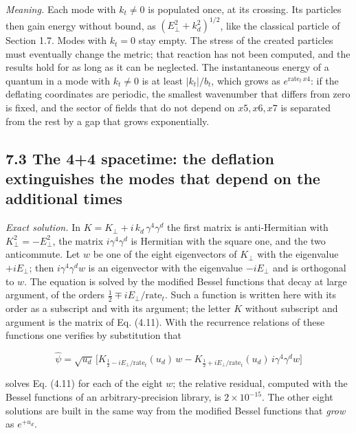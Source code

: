 \documentclass[
  10pt,
]{article}
\begin{document}
\emph{Meaning.} Each mode with \(k_t\neq0\) is populated once, at its
crossing. Its particles then gain energy without bound, as
\((E_\perp^2+k_d^2)^{1/2}\), like the classical particle of Section 1.7.
Modes with \(k_t=0\) stay empty. The stress of the created particles
must eventually change the metric; that reaction has not been computed,
and the results hold for as long as it can be neglected. The
instantaneous energy of a quantum in a mode with \(k_t\neq0\) is at
least \(|k_t|/b_t\), which grows as \(e^{\mathrm{rate}_t\,x4}\): if the
deflating coordinates are periodic, the smallest wavenumber that differs
from zero is fixed, and the sector of fields that do not depend on
\(x5,x6,x7\) is separated from the rest by a gap that grows
exponentially.

\hypertarget{the-44-spacetime-the-deflation-extinguishes-the-modes-that-depend-on-the-additional-times}{%
\subsection{7.3 The 4+4 spacetime: the deflation extinguishes the modes
that depend on the additional
times}\label{the-44-spacetime-the-deflation-extinguishes-the-modes-that-depend-on-the-additional-times}}

\emph{Exact solution.} In \(K=K_\perp+i\,k_d\,\gamma^4\gamma^d\) the
first matrix is anti-Hermitian with \(K_\perp^2=-E_\perp^2\), the matrix
\(i\gamma^4\gamma^d\) is Hermitian with the square one, and the two
anticommute. Let \(w\) be one of the eight eigenvectors of \(K_\perp\)
with the eigenvalue \(+iE_\perp\); then \(i\gamma^4\gamma^dw\) is an
eigenvector with the eigenvalue \(-iE_\perp\) and is orthogonal to
\(w\). The equation is solved by the modified Bessel functions that
decay at large argument, of the orders
\(\tfrac12\mp iE_\perp/\mathrm{rate}_t\). Such a function is written
here with its order as a subscript and with its argument; the letter
\(K\) without subscript and argument is the matrix of Eq. (4.11). With
the recurrence relations of these functions one verifies by substitution
that

\[\hat\psi=\sqrt{u_d}\,\Big[K_{\frac12-iE_\perp/\mathrm{rate}_t}(u_d)\,w
-K_{\frac12+iE_\perp/\mathrm{rate}_t}(u_d)\,i\gamma^4\gamma^dw\Big]\tag{7.5}\]

solves Eq. (4.11) for each of the eight \(w\); the relative residual,
computed with the Bessel functions of an arbitrary-precision library, is
\(2\times10^{-15}\). The other eight solutions are built in the same way
from the modified Bessel functions that \emph{grow} as \(e^{+u_d}\).
\end{document}
